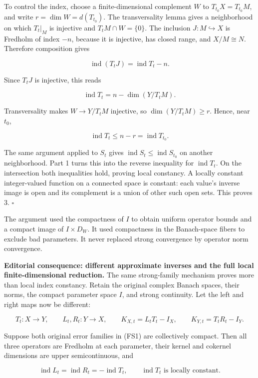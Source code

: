 \documentclass[
  11pt,
]{article}
\begin{document}
To control the index, choose a finite-dimensional complement \(W\) to
\(T_{t_0}X=T_{t_0}M\), and write \(r=\dim W=d(T_{t_0})\). The
transversality lemma gives a neighborhood on which \(T_t|_M\) is
injective and \(T_tM\cap W=\{0\}\). The inclusion
\(J:M\hookrightarrow X\) is Fredholm of index \(-n\), because it is
injective, has closed range, and \(X/M\cong N\). Therefore composition
gives

\[
\operatorname{ind}(T_tJ)=\operatorname{ind}T_t-n.
\]

Since \(T_tJ\) is injective, this reads

\[
\operatorname{ind}T_t=n-\dim(Y/T_tM).                         \tag{F19}
\]

Transversality makes \(W\to Y/T_tM\) injective, so
\(\dim(Y/T_tM)\geq r\). Hence, near \(t_0\),

\[
\operatorname{ind}T_t\leq n-r=\operatorname{ind}T_{t_0}.        \tag{F20}
\]

The same argument applied to \(S_t\) gives
\(\operatorname{ind}S_t\leq\operatorname{ind}S_{t_0}\) on another
neighborhood. Part 1 turns this into the reverse inequality for
\(\operatorname{ind}T_t\). On the intersection both inequalities hold,
proving local constancy. A locally constant integer-valued function on a
connected space is constant: each value's inverse image is open and its
complement is a union of other such open sets. This proves 3.
\(\square\)

The argument used the compactness of \(I\) to obtain uniform operator
bounds and a compact image of \(I\times D_W\). It used compactness in
the Banach-space fibers to exclude bad parameters. It never replaced
strong convergence by operator norm convergence.

\textbf{Editorial consequence: different approximate inverses and the
full local finite-dimensional reduction.} The same strong-family
mechanism proves more than local index constancy. Retain the original
complex Banach spaces, their norms, the compact parameter space \(I\),
and strong continuity. Let the left and right maps now be different:

\[
 T_t:X\longrightarrow Y,\qquad L_t,R_t:Y\longrightarrow X,\qquad
 K_{X,t}=L_tT_t-I_X,\qquad K_{Y,t}=T_tR_t-I_Y.                 \tag{FS1}
\]

Suppose both original error families in (FS1) are collectively compact.
Then all three operators are Fredholm at each parameter, their kernel
and cokernel dimensions are upper semicontinuous, and

\[
 \operatorname{ind}L_t=\operatorname{ind}R_t=-\operatorname{ind}T_t,
 \qquad \operatorname{ind}T_t\text{ is locally constant}.       \tag{FS2}
\]
\end{document}
